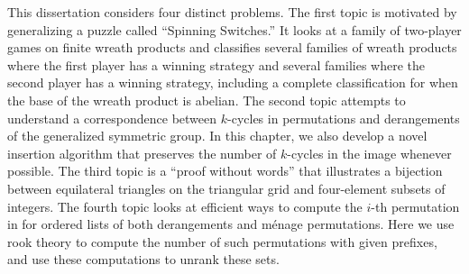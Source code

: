 This dissertation considers four distinct problems.
The first topic is motivated by generalizing a puzzle called
``Spinning Switches.'' It looks at a family of two-player games on finite wreath
products and classifies several families of wreath products where
the first player has a winning strategy and several families where the
second player has a winning strategy, including a complete classification
for when the base of the wreath product is abelian.
The second topic attempts to understand a correspondence between
$k$-cycles in permutations and derangements of the generalized symmetric
group. In this chapter, we also develop a novel insertion algorithm that
preserves the number of $k$-cycles in the image whenever possible.
The third topic is a ``proof without words'' that illustrates a bijection
between equilateral triangles on the triangular grid and four-element subsets
of integers.
The fourth topic looks at efficient ways to compute the $i$-th permutation
in for ordered lists of both derangements and m\'enage permutations. Here
we use rook theory to compute the number of such permutations with given
prefixes, and use these computations to unrank these sets.
